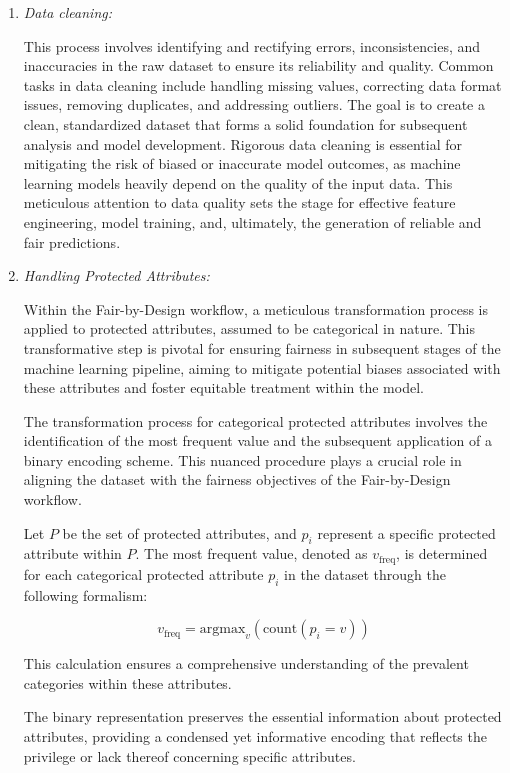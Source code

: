 \documentclass[12pt,a4paper,openright,twoside]{book}
\begin{document}
\begin{enumerate}

    \item \emph{Data cleaning:} 

    This process involves identifying and rectifying errors, inconsistencies, and inaccuracies in the raw dataset to ensure its reliability and quality. Common tasks in data cleaning include handling missing values, correcting data format issues, removing duplicates, and addressing outliers. The goal is to create a clean, standardized dataset that forms a solid foundation for subsequent analysis and model development. Rigorous data cleaning is essential for mitigating the risk of biased or inaccurate model outcomes, as machine learning models heavily depend on the quality of the input data. This meticulous attention to data quality sets the stage for effective feature engineering, model training, and, ultimately, the generation of reliable and fair predictions.

    \item \emph{Handling Protected Attributes:} 
    
    Within the Fair-by-Design workflow, a meticulous transformation process is applied to protected attributes, assumed to be categorical in nature. This transformative step is pivotal for ensuring fairness in subsequent stages of the machine learning pipeline, aiming to mitigate potential biases associated with these attributes and foster equitable treatment within the model.

    The transformation process for categorical protected attributes involves the identification of the most frequent value and the subsequent application of a binary encoding scheme. This nuanced procedure plays a crucial role in aligning the dataset with the fairness objectives of the Fair-by-Design workflow.

    Let $P$ be the set of protected attributes, and $p_i$ represent a specific protected attribute within $P$. The most frequent value, denoted as $v_{\text{freq}}$, is determined for each categorical protected attribute $p_i$ in the dataset through the following formalism:

    \[
    v_{\text{freq}} = \text{argmax}_v \left( \text{count}(p_i = v) \right)
    \]
    
    This calculation ensures a comprehensive understanding of the prevalent categories within these attributes.

    The binary representation preserves the essential information about protected attributes, providing a condensed yet informative encoding that reflects the privilege or lack thereof concerning specific attributes.


\end{enumerate}
\end{document}
